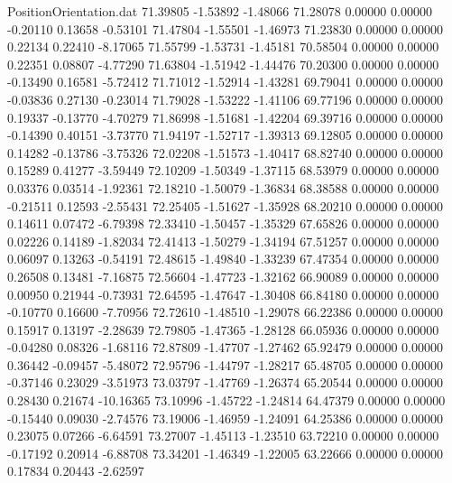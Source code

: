 \begin{filecontents}{PositionOrientation.dat}
  71.39805   -1.53892   -1.48066    71.28078    0.00000    0.00000   -0.20110    0.13658   -0.53101
  71.47804   -1.55501   -1.46973    71.23830    0.00000    0.00000    0.22134    0.22410   -8.17065
  71.55799   -1.53731   -1.45181    70.58504    0.00000    0.00000    0.22351    0.08807   -4.77290
  71.63804   -1.51942   -1.44476    70.20300    0.00000    0.00000   -0.13490    0.16581   -5.72412
  71.71012   -1.52914   -1.43281    69.79041    0.00000    0.00000   -0.03836    0.27130   -0.23014
  71.79028   -1.53222   -1.41106    69.77196    0.00000    0.00000    0.19337   -0.13770   -4.70279
  71.86998   -1.51681   -1.42204    69.39716    0.00000    0.00000   -0.14390    0.40151   -3.73770
  71.94197   -1.52717   -1.39313    69.12805    0.00000    0.00000    0.14282   -0.13786   -3.75326
  72.02208   -1.51573   -1.40417    68.82740    0.00000    0.00000    0.15289    0.41277   -3.59449
  72.10209   -1.50349   -1.37115    68.53979    0.00000    0.00000    0.03376    0.03514   -1.92361
  72.18210   -1.50079   -1.36834    68.38588    0.00000    0.00000   -0.21511    0.12593   -2.55431
  72.25405   -1.51627   -1.35928    68.20210    0.00000    0.00000    0.14611    0.07472   -6.79398
  72.33410   -1.50457   -1.35329    67.65826    0.00000    0.00000    0.02226    0.14189   -1.82034
  72.41413   -1.50279   -1.34194    67.51257    0.00000    0.00000    0.06097    0.13263   -0.54191
  72.48615   -1.49840   -1.33239    67.47354    0.00000    0.00000    0.26508    0.13481   -7.16875
  72.56604   -1.47723   -1.32162    66.90089    0.00000    0.00000    0.00950    0.21944   -0.73931
  72.64595   -1.47647   -1.30408    66.84180    0.00000    0.00000   -0.10770    0.16600   -7.70956
  72.72610   -1.48510   -1.29078    66.22386    0.00000    0.00000    0.15917    0.13197   -2.28639
  72.79805   -1.47365   -1.28128    66.05936    0.00000    0.00000   -0.04280    0.08326   -1.68116
  72.87809   -1.47707   -1.27462    65.92479    0.00000    0.00000    0.36442   -0.09457   -5.48072
  72.95796   -1.44797   -1.28217    65.48705    0.00000    0.00000   -0.37146    0.23029   -3.51973
  73.03797   -1.47769   -1.26374    65.20544    0.00000    0.00000    0.28430    0.21674  -10.16365
  73.10996   -1.45722   -1.24814    64.47379    0.00000    0.00000   -0.15440    0.09030   -2.74576
  73.19006   -1.46959   -1.24091    64.25386    0.00000    0.00000    0.23075    0.07266   -6.64591
  73.27007   -1.45113   -1.23510    63.72210    0.00000    0.00000   -0.17192    0.20914   -6.88708
  73.34201   -1.46349   -1.22005    63.22666    0.00000    0.00000    0.17834    0.20443   -2.62597

\end{filecontents}
